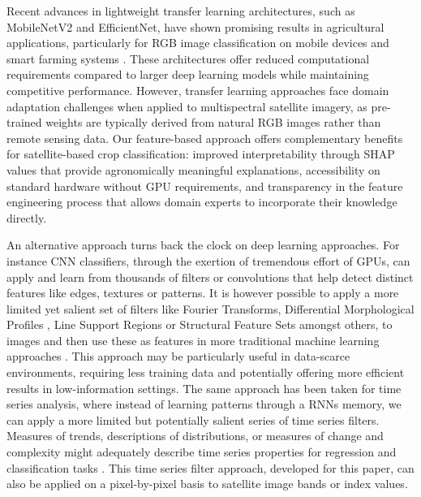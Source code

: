 \documentclass[
  journal,
  twocolumn]{IEEEtran}
\begin{document}
Recent advances in lightweight transfer learning architectures, such as
MobileNetV2 and EfficientNet, have shown promising results in
agricultural applications, particularly for RGB image classification on
mobile devices and smart farming systems
\citep{sandler2018mobilenetv2, tan2019efficientnet}. These architectures
offer reduced computational requirements compared to larger deep
learning models while maintaining competitive performance. However,
transfer learning approaches face domain adaptation challenges when
applied to multispectral satellite imagery, as pre-trained weights are
typically derived from natural RGB images rather than remote sensing
data. Our feature-based approach offers complementary benefits for
satellite-based crop classification: improved interpretability through
SHAP values that provide agronomically meaningful explanations,
accessibility on standard hardware without GPU requirements, and
transparency in the feature engineering process that allows domain
experts to incorporate their knowledge directly.

An alternative approach turns back the clock on deep learning
approaches. For instance CNN classifiers, through the exertion of
tremendous effort of GPUs, can apply and learn from thousands of filters
or convolutions that help detect distinct features like edges, textures
or patterns. It is however possible to apply a more limited yet salient
set of filters like Fourier Transforms, Differential Morphological
Profiles \citep{pesaresi2001new}, Line Support Regions or Structural
Feature Sets \citep{huang2007classification} amongst others, to images
and then use these as features in more traditional machine learning
approaches \citetext{\citealp[\citet{owusu2024towards},
\citet{engstrom2022poverty}]{graesser2012image}; \citealp{chao2021evaluating}; \citealp{urbansci7040116}}.
This approach may be particularly useful in data-scarce environments,
requiring less training data and potentially offering more efficient
results in low-information settings. The same approach has been taken
for time series analysis, where instead of learning patterns through a
RNNs memory, we can apply a more limited but potentially salient series
of time series filters. Measures of trends, descriptions of
distributions, or measures of change and complexity might adequately
describe time series properties for regression and classification tasks
\citep{christ2018time, yang2021anomaly}. This time series filter
approach, developed for this paper, can also be applied on a
pixel-by-pixel basis to satellite image bands or index
values\citep{xr_fresh_2021}.
\end{document}
